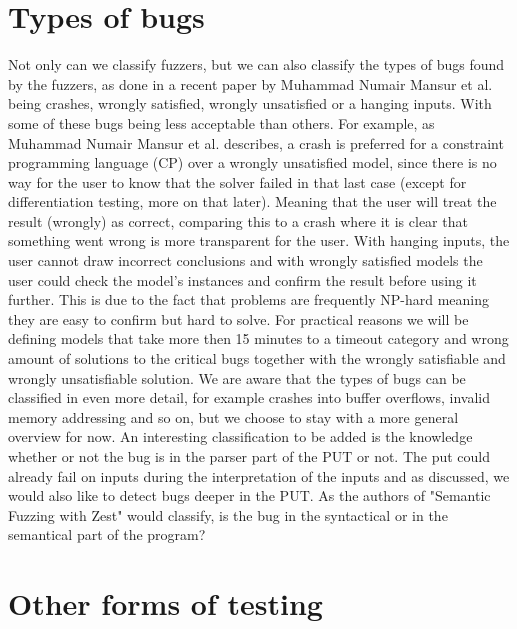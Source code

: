 \section{Types of bugs}
\label{fuzzing:TypesOfBugs}
Not only can we classify fuzzers, but we can also classify the types of bugs found by the fuzzers, as done in a recent paper \cite{1mansur2020detecting} by Muhammad Numair Mansur et al. being crashes, wrongly satisfied, wrongly unsatisfied or a hanging inputs. With some of these bugs being less acceptable than others. For example, as Muhammad Numair Mansur et al. describes, a crash is preferred for a constraint programming language (CP) over a wrongly unsatisfied model, since there is no way for the user to know that the solver failed in that last case (except for differentiation testing, more on that later). Meaning that the user will treat the result (wrongly) as correct, comparing this to a crash where it is clear that something went wrong is more transparent for the user. With hanging inputs, the user cannot draw incorrect conclusions and with wrongly satisfied models the user could check the model's instances and confirm the result before using it further. This is due to the fact that problems are frequently NP-hard meaning they are easy to confirm but hard to solve. 
For practical reasons we will be defining models that take more then 15 minutes to a timeout category and wrong amount of solutions to the critical bugs together with the wrongly satisfiable and wrongly unsatisfiable solution. We are aware that the types of bugs can be classified in even more detail, for example crashes into buffer overflows, invalid memory addressing and so on, but we choose to stay with a more general overview for now. An interesting classification to be added is the knowledge whether or not the bug is in the parser part of the PUT or not. The put could already fail on inputs during the interpretation of the inputs and as discussed, we would also like to detect bugs deeper in the PUT. As the authors of "Semantic Fuzzing with Zest" \cite{22SemanticFuzzing} would classify, is the bug in the syntactical or in the semantical part of the program?

\section{Other forms of testing}
